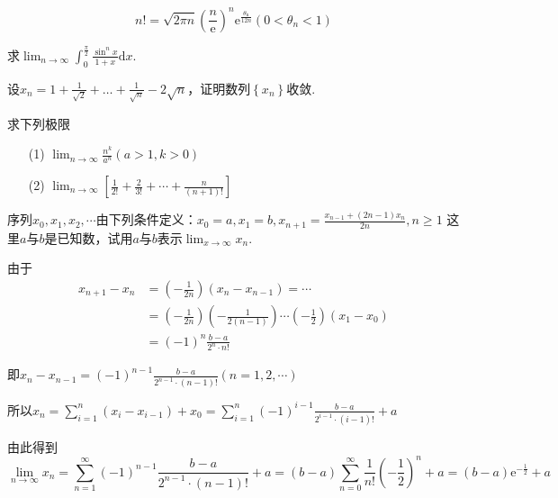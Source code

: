 \begin{xiti}
\begin{solution}
\begin{enumerate}
	\[n !=\sqrt{2 \pi n}\left(\frac{n}{\mathrm{e}}\right)^{n} \mathrm{e}^{\frac{\theta_{\mathrm{n}}}{12 n}}\left(0<\theta_{n}<1\right)\]	
	\end{enumerate}
\end{solution}
\item 求$\lim _ { n \rightarrow \infty } \int _ { 0 } ^ { \frac { \pi } { 2 } } \frac { \sin ^ { n } x } { 1 + x } \mathrm { d } x$.
\item 设$x _ { n } = 1 + \frac { 1 } { \sqrt { 2 } } + \dots + \frac { 1 } { \sqrt { n } } - 2 \sqrt { n }$，证明数列$\left\lbrace x_{n}\right\rbrace $收敛.
\item 求下列极限
\begin{enumerate}
	\item[(1)] $\lim _ { n \rightarrow \infty } \frac { n ^ { k } } { a ^ { n } } ( a > 1 , k > 0 )$
	\item[(2)] $\lim _ { n \rightarrow \infty } \left[ \frac { 1 } { 2 ! } + \frac { 2 } { 3 ! } + \cdots + \frac { n } { ( n + 1 ) ! } \right]$
\end{enumerate}
\item 序列$x _ { 0 } , x _ { 1 } , x _ { 2 } , \cdots$由下列条件定义：$x _ { 0 } = a , x _ { 1 } = b , x _ { n + 1 } = \frac { x _ { n - 1 } + ( 2 n - 1 ) x _ { n } } { 2 n } , n \geqslant 1$
\noindent 这里$a$与$b$是已知数，试用$a$与$b$表示$\lim_{ x \rightarrow \infty }x_{n}$.
\begin{solution}
	由于\begin{align*} 
	x_{n+1}-x_{n} &=\left(-\frac{1}{2 n}\right)\left(x_{n}-x_{n-1}\right)=\cdots \\ &=\left(-\frac{1}{2 n}\right)\left(-\frac{1}{2(n-1)}\right) \cdots\left(-\frac{1}{2}\right)\left(x_{1}-x_{0}\right) \\ &=(-1)^{n} \frac{b-a}{2^{n} \cdot n !} 
	\end{align*}
	
	即$x_{n}-x_{n-1}=(-1)^{n-1} \frac{b-a}{2^{n-1} \cdot(n-1) !}(n=1,2, \cdots)$
	
	所以$x_{n}=\sum_{i=1}^{n}\left(x_{i}-x_{i-1}\right)+x_{0}=\sum_{i=1}^{n}(-1)^{i-1} \frac{b-a}{2^{i-1} \cdot(i-1) !}+a$
	
	由此得到
	\[
	\lim _{n \rightarrow \infty} x_{n}=\sum_{n=1}^{\infty}(-1)^{n-1} \frac{b-a}{2^{n-1} \cdot(n-1) !}+a=(b-a) \sum_{n=0}^{\infty} \frac{1}{n !}\left(-\frac{1}{2}\right)^{n}+a=(b-a) \mathrm{e}^{-\frac{1}{2}}+a 
	\]
	

\end{solution}
\end{xiti}

